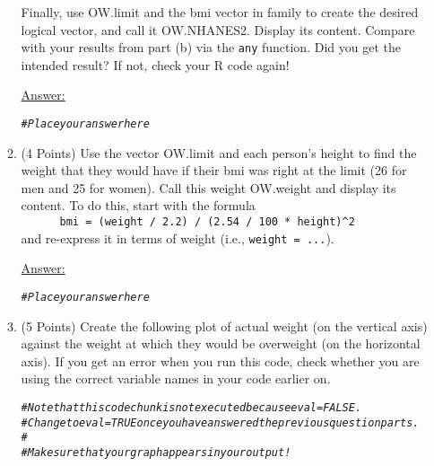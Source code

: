 \documentclass[12pt,letterpaper,final]{article}\usepackage[]{graphicx}\usepackage[]{xcolor}
\makeatletter
\newcommand{\hlcom}[1]{\textcolor[rgb]{0.678,0.584,0.686}{\textit{#1}}}%
\newenvironment{kframe}{%
 \def\at@end@of@kframe{}%
 \ifinner\ifhmode%
  \def\at@end@of@kframe{\end{minipage}}%
  \begin{minipage}{\columnwidth}%
 \fi\fi%
 \def\FrameCommand##1{\hskip\@totalleftmargin \hskip-\fboxsep
 \colorbox{shadecolor}{##1}\hskip-\fboxsep
     \hskip-\linewidth \hskip-\@totalleftmargin \hskip\columnwidth}%
 \MakeFramed {\advance\hsize-\width
   \@totalleftmargin\z@ \linewidth\hsize
   \@setminipage}}%
 {\par\unskip\endMakeFramed%
 \at@end@of@kframe}
\newenvironment{knitrout}{}{} %
\makeatother
\begin{document}
\begin{enumerate}
\begin{enumerate}
Finally, use OW.limit and the bmi vector in family to create the desired logical vector, 
and call it OW.NHANES2. Display its content.
Compare with your results from part (b) via the \verb|any| function.
Did you get the intended result? If not, check your R code again!

\underline{Answer:}
\begin{knitrout}
\color{fgcolor}\begin{kframe}
\begin{alltt}
\hlcom{# Place your answer here}
\end{alltt}
\end{kframe}
\end{knitrout}


\item (4 Points)
Use the vector OW.limit and each person's height to find the weight 
that they would have if their bmi was right at the limit (26 for men and 
25 for women). Call this weight OW.weight and display its content.
To do this, start with the formula \\
\verb|      bmi = (weight / 2.2) / (2.54 / 100 * height)^2| \\
and re-express it in terms of weight (i.e., \verb|weight = ...|).

\underline{Answer:}
\begin{knitrout}
\color{fgcolor}\begin{kframe}
\begin{alltt}
\hlcom{# Place your answer here}
\end{alltt}
\end{kframe}
\end{knitrout}


\item (5 Points)
Create the following plot of actual weight (on the vertical axis)
against the weight at which they would be overweight (on the horizontal axis).
If you get an error when you run this code, check whether you are using
the correct variable names in your code earlier on.

\begin{knitrout}
\color{fgcolor}\begin{kframe}
\begin{alltt}
\hlcom{# Note that this code chunk is not executed because eval=FALSE.}
\hlcom{# Change to eval=TRUE once you have answered the previous question parts.}
\hlcom{#}
\hlcom{# Make sure that your graph appears in your output!}


\end{alltt}
\end{kframe}
\end{knitrout}
\end{enumerate}
\end{enumerate}
\end{document}
